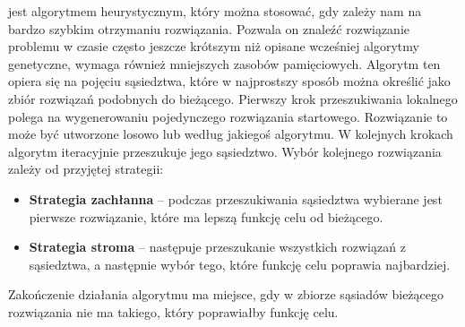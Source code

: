  jest algorytmem heurystycznym, który można stosować, gdy zależy nam na bardzo szybkim otrzymaniu rozwiązania. 
Pozwala on znaleźć rozwiązanie problemu w czasie często jeszcze krótszym niż opisane wcześniej algorytmy genetyczne, wymaga również 
mniejszych zasobów pamięciowych. Algorytm ten opiera się na pojęciu sąsiedztwa, które w najprostszy sposób można określić jako zbiór rozwiązań 
podobnych do bieżącego. Pierwszy krok przeszukiwania lokalnego polega na wygenerowaniu pojedynczego rozwiązania startowego. Rozwiązanie to 
może być utworzone losowo lub według jakiegoś algorytmu. W kolejnych krokach algorytm iteracyjnie przeszukuje jego sąsiedztwo. Wybór kolejnego 
rozwiązania zależy od przyjętej strategii:
\begin{itemize}
	\item \textbf{Strategia zachłanna} -- podczas przeszukiwania sąsiedztwa wybierane jest pierwsze rozwiązanie, które ma lepszą funkcję celu od bieżącego.
	\item \textbf{Strategia stroma} -- następuje przeszukanie wszystkich rozwiązań z sąsiedztwa, a następnie wybór tego, które funkcję celu poprawia najbardziej.
\end{itemize}

Zakończenie działania algorytmu ma miejsce, gdy w zbiorze sąsiadów bieżącego rozwiązania nie ma takiego, który poprawiałby funkcję celu.

